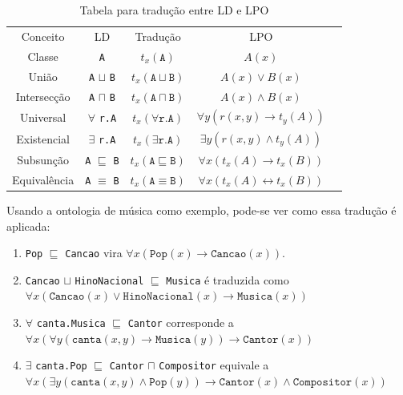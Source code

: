 \begin{table}[H]
	\centering
	\begin{tabular}{|c|c|c|c|l}
		\cline{1-4}
		Conceito     & LD                                    & Tradução                                 & LPO                                              &  \\ \cline{1-4}
		Classe       & \texttt{A}                            & $t_x(\texttt{A})$                        & $A(x)$                                           &  \\ \cline{1-4}
		União        & \texttt{A} $ \sqcup $ \texttt{B}      & $t_x(\texttt{A} \sqcup \texttt{B})$      & $A(x) \lor B(x)$                                 &  \\ \cline{1-4}
		Intersecção  & \texttt{A} $ \sqcap $ \texttt{B}      & $t_x(\texttt{A} \sqcap \texttt{B})$      & $A(x) \land B(x)$                                &  \\ \cline{1-4}
		Universal    & $\forall$ \texttt{r.A}                & $t_x(\forall \texttt{r.A})$              & $\forall y(r(x,y) \to t_y(A))$                   &  \\ \cline{1-4}
		Existencial  & $\exists$ \texttt{r.A}                & $t_x(\exists \texttt{r.A})$              & $\exists y(r(x,y) \land t_y(A))$                 &  \\ \cline{1-4}
		Subsunção    & \texttt{A} $ \sqsubseteq $ \texttt{B} & $t_x(\texttt{A} \sqsubseteq \texttt{B})$ & $\forall x(t_x(A) \to t_x(B))$                   &  \\ \cline{1-4}
		Equivalência & \texttt{A} $ \equiv $ \texttt{B}      & $t_x(\texttt{A} \equiv \texttt{B})$      & $\forall x(t_x(A) \longleftrightarrow t_x(B))$   &  \\ \cline{1-4}
	\end{tabular}
	\caption{Tabela para tradução entre LD e LPO}
\end{table}

Usando a ontologia de música como exemplo, pode-se ver como essa tradução é aplicada:

\begin{enumerate}
	\item \texttt{Pop} $ \sqsubseteq $ \texttt{Cancao} vira $\forall x(\texttt{Pop}(x) \to \texttt{Cancao}(x))$.
	\item \texttt{Cancao} $ \sqcup $ \texttt{HinoNacional} $ \sqsubseteq $ \texttt{Musica} é traduzida como $\forall x(\texttt{Cancao}(x) \lor \texttt{HinoNacional}(x) \to \texttt{Musica}(x))$
	\item $ \forall $ \texttt{canta.Musica} $ \sqsubseteq $ \texttt{Cantor} corresponde a $ \forall x(\forall y(\texttt{canta}(x,y) \to \texttt{Musica}(y)) \to \texttt{Cantor}(x)) $
	\item $ \exists $ \texttt{canta.Pop} $ \sqsubseteq $ \texttt{Cantor} $ \sqcap $ \texttt{Compositor} equivale a $ \forall x (\exists y(\texttt{canta}(x,y) \land \texttt{Pop}(y)) \to \texttt{Cantor}(x) \land \texttt{Compositor}(x))$
\end{enumerate}


